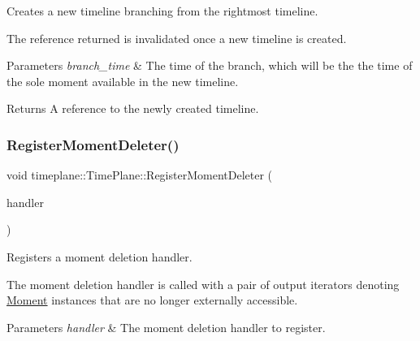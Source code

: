 Creates a new timeline branching from the rightmost timeline. 

The reference returned is invalidated once a new timeline is created. 
\begin{DoxyParams}{Parameters}
{\em branch\+\_\+time} & The time of the branch, which will be the the time of the sole moment available in the new timeline. \\
\hline
\end{DoxyParams}
\begin{DoxyReturn}{Returns}
A reference to the newly created timeline. 
\end{DoxyReturn}
\mbox{\label{classtimeplane_1_1_time_plane_a10f6e26c2043a2d2cb0271a06c2495d0}} 
\subsubsection{\texorpdfstring{Register\+Moment\+Deleter()}{RegisterMomentDeleter()}}
{\footnotesize\ttfamily void timeplane\+::\+Time\+Plane\+::\+Register\+Moment\+Deleter (\begin{DoxyParamCaption}\item[{Moment\+Deleter}]{handler }\end{DoxyParamCaption})\hspace{0.3cm}{\ttfamily [inline]}}



Registers a moment deletion handler. 

The moment deletion handler is called with a pair of output iterators denoting {\ttfamily \hyperlink{classtimeplane_1_1_moment}{Moment}} instances that are no longer externally accessible. 
\begin{DoxyParams}{Parameters}
{\em handler} & The moment deletion handler to register. \\
\hline
\end{DoxyParams}
\mbox{\label{classtimeplane_1_1_time_plane_a317c9e247011cf5f4e6e36f2f7651932}} 
